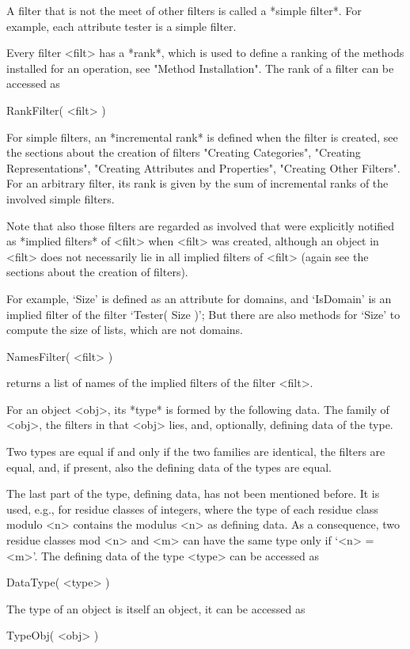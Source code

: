A filter that is not the meet of other filters
is called a *simple filter*.
For example, each attribute tester is a simple filter.

Every filter <filt> has a *rank*, which is used to define a ranking of
the methods installed for an operation, see "Method Installation".
The rank of a filter can be accessed as

\>RankFilter( <filt> )

For simple filters, an *incremental rank* is defined when the filter is
created, see the sections about the creation of filters
"Creating Categories", "Creating Representations",
"Creating Attributes and Properties", "Creating Other Filters".
For an arbitrary filter, its rank is given by the sum of incremental
ranks of the involved simple filters.

Note that also those filters are regarded as involved that were
explicitly notified as *implied filters* of <filt> when <filt> was
created, although an object in <filt> does not necessarily lie in all
implied filters of <filt> (again see the sections about the creation of
filters).

For example, `Size' is defined as an attribute for domains,
and `IsDomain' is an implied filter of the filter `Tester( Size )';
But there are also methods for `Size' to compute the size of lists,
which are not domains.

\>NamesFilter( <filt> )

returns a list of names of the implied filters of the filter <filt>.


For an object <obj>, its *type* is formed by the following data.
The family of <obj>,
the filters in that <obj> lies,
and, optionally, defining data of the type.

Two types are equal if and only if the two families are identical,
the filters are equal, and, if present, also the defining data of the
types are equal.

The last part of the type, defining data, has not been mentioned before.
It is used, e.g., for residue classes of integers, where the type of each
residue class modulo <n> contains the modulus <n> as defining data.
As a consequence, two residue classes mod <n> and <m> can have the same
type only if `<n> = <m>'.
The defining data of the type <type> can be accessed as

\>DataType( <type> )

The type of an object is itself an object,
it can be accessed as

\>TypeObj( <obj> )


